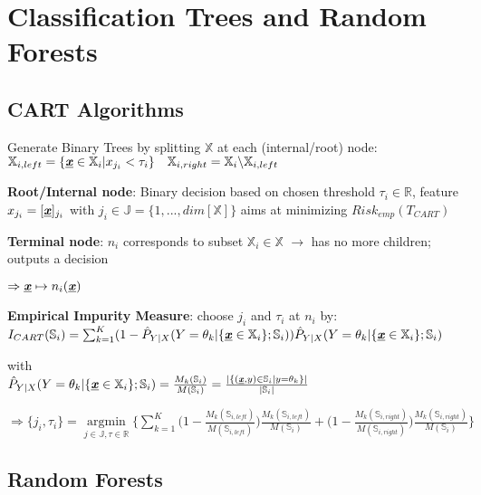 \section{Classification Trees and Random Forests}

\begin{sectionbox}
	\subsection{CART Algorithms}
	Generate Binary Trees by splitting $\mathbb X$ at each (internal/root) node: $\mathbb{X}_{i,left}=\{\underline{\textbf{\textit{x}}}\in\mathbb{X}_i|x_{j_i}<\tau_i\}\quad\mathbb{X}_{i,right}=\mathbb{X}_i\backslash\mathbb{X}_{i,left}$
	
	\textbf{Root/Internal node}: Binary decision based on chosen threshold $\tau_i\in\mathbb{R}$, feature $x_{j_i}=[\underline{\textbf{\textit{x}}}]_{j_i}$ with $j_i\in\mathbb{J}=\{1,...,dim[\mathbb{X}]\}$ aims at minimizing $Risk_{emp}(T_{CART})$
	
	\textbf{Terminal node}: $n_i$ corresponds to subset $\mathbb{X}_i\in\mathbb{X}$ $\rightarrow$ has no more children; outputs a decision
	
	$\Rightarrow \underline{\textbf{\textit{x}}}\mapsto n_i(\underline{\textbf{\textit{x}}})$  
	
	\textbf{Empirical Impurity Measure}: choose $j_i$ and $\tau_i$ at $n_i$ by:
	$I_{CART}(\mathbb{S}_i)=\sum_{k=1}^{K}(1-\hat{P}_{Y|X}(Y=\theta_k|\{\underline{\textbf{\textit{x}}}\in\mathbb{X}_i\};\mathbb{S}_i))\hat{P}_{Y|X}(Y=\theta_k|\{\underline{\textbf{\textit{x}}}\in\mathbb{X}_i\};\mathbb{S}_i)$
	
	with\\ $\hat{P}_{Y|X}(Y=\theta_k|\{\underline{\textbf{\textit{x}}}\in\mathbb{X}_i\};\mathbb{S}_i)=\frac{M_k(\mathbb{S}_i)}{M(\mathbb{S}_i)}=\frac{|\{(\underline{\textbf{\textit{x}}},y)\in\mathbb{S}_i|y=\theta_k\}|}{|\mathbb{S}_i|}$
	
	$\Rightarrow \{j_i,\tau_i\}=\underset{j\in\mathbb{J},\tau\in\mathbb{R}}{\operatorname{argmin}}\Big\{\sum_{k=1}^{K}\Big(1-\frac{M_k(\mathbb{S}_{i,left})}{M(\mathbb{S}_{i,left})}\Big)\frac{M_k(\mathbb{S}_{i,left})}{M(\mathbb{S}_{i})}+\Big(1-\frac{M_k(\mathbb{S}_{i,right})}{M(\mathbb{S}_{i,right})}\Big)\frac{M_k(\mathbb{S}_{i,right})}{M(\mathbb{S}_{i})}\Big\}$
	
	
	
	
\end{sectionbox}

\begin{sectionbox}
	\subsection{Random Forests}	
\end{sectionbox}
